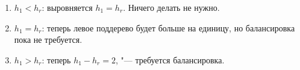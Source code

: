 \begin{enumerate}
    \item $h_1 < h_r$: выровняется $h_1 = h_r$. Ничего делать не нужно.
    \item $h_1 = h_r$: теперь левое поддерево будет больше на единицу,
    но балансировка пока не требуется.
    \item $h_1 > h_r$: теперь $h_1 - h_r = 2$, "--- требуется балансировка.
\end{enumerate}
